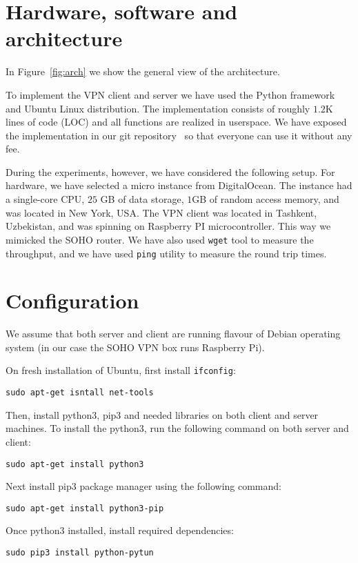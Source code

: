 \section{Hardware, software and architecture}
\label{sec:hardware}

In Figure~\ref{fig:arch} we show the general view of the architecture. 

To implement the VPN client and server we have used the Python 
framework and Ubuntu Linux distribution. The implementation consists 
of roughly $1.2$K lines of code (LOC) and all functions are realized 
in userspace. We have exposed the implementation in our git 
repository~\cite{impl} so that everyone can use it without any fee.

During the experiments, however, we have considered the following setup. 
For hardware, we have selected a micro instance from DigitalOcean. The 
instance had a single-core CPU, $25$ GB of data storage, $1$GB of random 
access memory, and was located in New York, USA. The VPN client was located 
in Tashkent, Uzbekistan, and was spinning on Raspberry PI microcontroller. 
This way we mimicked the SOHO router. We have also used \texttt{wget} tool to measure 
the throughput, and we have used \texttt{ping} utility to measure the round trip times. 

\section{Configuration}
\label{sec:configuration}

We assume that both server and client are 
running flavour of Debian operating system
(in our case the SOHO VPN box runs Raspberry Pi).

On fresh installation of Ubuntu, first install
\texttt{ifconfig}:

\texttt{sudo apt-get isntall net-tools}

Then, install python3, pip3 and 
needed libraries on both client and server 
machines. To install the python3, run the 
following command on both server and client:

\texttt{sudo apt-get install python3}

Next install pip3 package manager using 
the following command:

\texttt{sudo apt-get install python3-pip}

Once python3 installed, install 
required dependencies:

\texttt{sudo pip3 install python-pytun}

